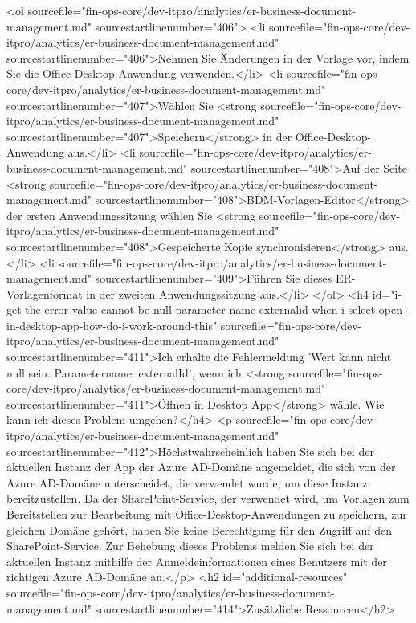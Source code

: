 <ol sourcefile="fin-ops-core/dev-itpro/analytics/er-business-document-management.md" sourcestartlinenumber="406">
<li sourcefile="fin-ops-core/dev-itpro/analytics/er-business-document-management.md" sourcestartlinenumber="406">Nehmen Sie Änderungen in der Vorlage vor, indem Sie die Office-Desktop-Anwendung verwenden.</li>
<li sourcefile="fin-ops-core/dev-itpro/analytics/er-business-document-management.md" sourcestartlinenumber="407">Wählen Sie <strong sourcefile="fin-ops-core/dev-itpro/analytics/er-business-document-management.md" sourcestartlinenumber="407">Speichern</strong> in der Office-Desktop-Anwendung aus.</li>
<li sourcefile="fin-ops-core/dev-itpro/analytics/er-business-document-management.md" sourcestartlinenumber="408">Auf der Seite <strong sourcefile="fin-ops-core/dev-itpro/analytics/er-business-document-management.md" sourcestartlinenumber="408">BDM-Vorlagen-Editor</strong> der ersten Anwendungssitzung wählen Sie <strong sourcefile="fin-ops-core/dev-itpro/analytics/er-business-document-management.md" sourcestartlinenumber="408">Gespeicherte Kopie synchronisieren</strong> aus.</li>
<li sourcefile="fin-ops-core/dev-itpro/analytics/er-business-document-management.md" sourcestartlinenumber="409">Führen Sie dieses ER-Vorlagenformat in der zweiten Anwendungssitzung aus.</li>
</ol>
<h4 id="i-get-the-error-value-cannot-be-null-parameter-name-externalid-when-i-select-open-in-desktop-app-how-do-i-work-around-this" sourcefile="fin-ops-core/dev-itpro/analytics/er-business-document-management.md" sourcestartlinenumber="411">Ich erhalte die Fehlermeldung 'Wert kann nicht null sein. Parametername: externalId', wenn ich <strong sourcefile="fin-ops-core/dev-itpro/analytics/er-business-document-management.md" sourcestartlinenumber="411">Öffnen in Desktop App</strong> wähle. Wie kann ich dieses Problem umgehen?</h4>
<p sourcefile="fin-ops-core/dev-itpro/analytics/er-business-document-management.md" sourcestartlinenumber="412">Höchstwahrscheinlich haben Sie sich bei der aktuellen Instanz der App der Azure AD-Domäne angemeldet, die sich von der Azure AD-Domäne unterscheidet, die verwendet wurde, um diese Instanz bereitzustellen. Da der SharePoint-Service, der verwendet wird, um Vorlagen zum Bereitstellen zur Bearbeitung mit Office-Desktop-Anwendungen zu speichern, zur gleichen Domäne gehört, haben Sie keine Berechtigung für den Zugriff auf den SharePoint-Service. Zur Behebung dieses Problems melden Sie sich bei der aktuellen Instanz mithilfe der Anmeldeinformationen eines Benutzers mit der richtigen Azure AD-Domäne an.</p>
<h2 id="additional-resources" sourcefile="fin-ops-core/dev-itpro/analytics/er-business-document-management.md" sourcestartlinenumber="414">Zusätzliche Ressourcen</h2>
